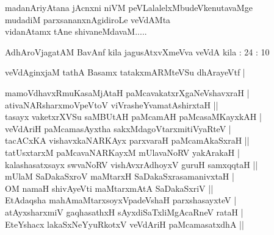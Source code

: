 \begin{entry}
\begin{shl}
madanAriyAtana jAcnxni niVM peVLalalelxMbudeVkenutavaMge\\
mudadiM parxsananxnAgidiroLe veVdAMta\\
vidanAtamx tAne shivaneMdavaM.....
\end{shl}
\end{entry}

\begin{entry}
\gl{}
\info{}{}{}{}
\begin{shl}
AdhAroVjagatAM BavAnf kila jagusAtxvXmeVva veVdA kila : 24 : 10
\end{shl}
\end{entry}

\begin{entry}
\begin{shl}
veVdAginxjaM tathA Basamx tatakxmARMteVSu dhArayeVtf |
\end{shl}
\end{entry}

\begin{entry}
\begin{shl}
mamoVdhavxRmuKasaMjAtaH paMcavakatxrXgaNeVshavxraH |\\
ativaNARsharxmoVpeVtoV viVrasheYvamatAshirxtaH ||\\
tasayx vaketxrXVSu saMBUtAH paMcamAH paMcasaMKayxkAH |\\
veVdAriH paMcamasAyxtha sakxMdagoVtarxmitiVyaRteV |\\
tacACxKA vishavxkaNARKAyx parxvaraH paMcamAkaSxraH ||\\
tatUsxtarxM paMcavaNARKayxM mUlavaNoRV yakArakaH |\\
kalashasatxsayx swvaNoRV vishAvxrAdhoyxV guruH samxqqtaH ||\\
mUlaM SaDakaSxroV maMtarxH SaDakaSxrasamanivxtaH |\\
OM namaH shivAyeVti maMtarxmAtA SaDakaSxriV ||\\
EtAdaqsha mahAmaMtarxsoyxVpadeVshaH parxshasayxteV |\\
atAyxsharxmiV gaqhasathxH sAyxdiSaTxliMgAcaRneV rataH |\\
EteYshacx lakaSxNeYyuRkotxV veVdAriH paMcamasatxdhA ||
\end{shl}
\end{entry}

